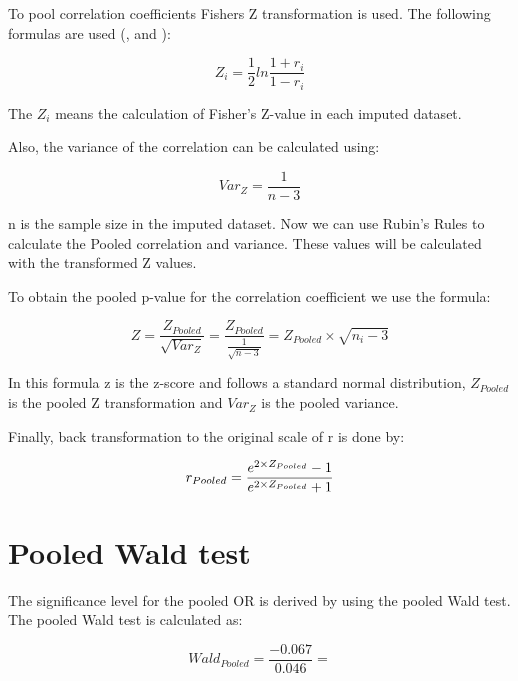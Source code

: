 \documentclass[
]{book}
\begin{document}
To pool correlation coefficients Fishers Z transformation is used. The following formulas are used (\citet{raghunathan2016}, \citet{VanBuuren2018} and \citet{enders2010applied}):

\begin{equation}
Z_i = \frac{1}{2}ln\frac{1+r_i}{1-r_i}
  \label{eq:cor}
\end{equation}

The \({Z_i}\) means the calculation of Fisher's Z-value in each imputed dataset.

Also, the variance of the correlation can be calculated using:

\begin{equation}
Var_Z=\frac{1}{n-3}
  \label{eq:var-cor}
\end{equation}

n is the sample size in the imputed dataset. Now we can use Rubin's Rules to calculate the Pooled correlation and variance. These values will be calculated with the transformed Z values.

To obtain the pooled p-value for the correlation coefficient we use the formula:

\begin{equation}
Z=\frac{Z_{Pooled}}{\sqrt{Var_Z}} = \frac{Z_{Pooled}}{\frac{1}{\sqrt{n-3}}}=Z_{Pooled}\times\sqrt{n_i-3}
  \label{eq:z-cor}
\end{equation}

In this formula z is the z-score and follows a standard normal distribution, \(Z_{Pooled}\) is the pooled Z transformation and \(Var_Z\) is the pooled variance.

Finally, back transformation to the original scale of r is done by:

\begin{equation}
r_{Pooled} = \frac{e^{2\times\\Z_{Pooled}}-1}{e^{2\times\\Z_{Pooled}}+1}
  \label{eq:exp-cor}
\end{equation}

\hypertarget{pooled-wald-test}{%
\chapter{Pooled Wald test}\label{pooled-wald-test}}

The significance level for the pooled OR is derived by using the pooled Wald test. The pooled Wald test is calculated as:

\[Wald_{Pooled} =\frac{-0.067}{0.046}=\]
\end{document}
